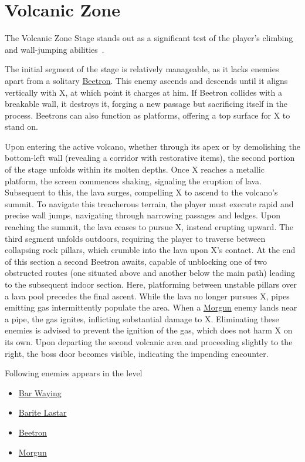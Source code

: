 \section{Volcanic Zone}
The Volcanic Zone Stage stands out as a significant test of the player's climbing and wall-jumping abilities~\cite{stratwiki:Volcanic_zone}.

The initial segment of the stage is relatively manageable, as it lacks enemies apart from a solitary \hyperlink{enem:Beetron}{Beetron}. This enemy ascends and descends until it aligns vertically with X, at which point it charges at him. If Beetron collides with a breakable wall, it destroys it, forging a new passage but sacrificing itself in the process. Beetrons can also function as platforms, offering a top surface for X to stand on.

Upon entering the active volcano, whether through its apex or by demolishing the bottom-left wall (revealing a corridor with restorative items), the second portion of the stage unfolds within its molten depths. Once X reaches a metallic platform, the screen commences shaking, signaling the eruption of lava. Subsequent to this, the lava surges, compelling X to ascend to the volcano's summit. To navigate this treacherous terrain, the player must execute rapid and precise wall jumps, navigating through narrowing passages and ledges. Upon reaching the summit, the lava ceases to pursue X, instead erupting upward. The third segment unfolds outdoors, requiring the player to traverse between collapsing rock pillars, which crumble into the lava upon X's contact. At the end of this section a second Beetron awaits, capable of unblocking one of two obstructed routes (one situated above and another below the main path) leading to the subsequent indoor section. Here, platforming between unstable pillars over a lava pool precedes the final ascent. While the lava no longer pursues X, pipes emitting gas intermittently populate the area. When a \hyperlink{enem:Morgun}{Morgun} enemy lands near a pipe, the gas ignites, inflicting substantial damage to X. Eliminating these enemies is advised to prevent the ignition of the gas, which does not harm X on its own.
Upon departing the second volcanic area and proceeding slightly to the right, the boss door becomes visible, indicating the impending encounter.

Following enemies appears in the level~\cite{wiki:Volcanic_zone}
\begin{itemize}
	\item \hyperlink{enem:Bar_Waying}{Bar Waying}
	\item \hyperlink{enem:Barite_Lastar}{Barite Lastar}
	\item \hyperlink{enem:Beetron}{Beetron}
	\item \hyperlink{enem:Morgun}{Morgun}
\end{itemize}


